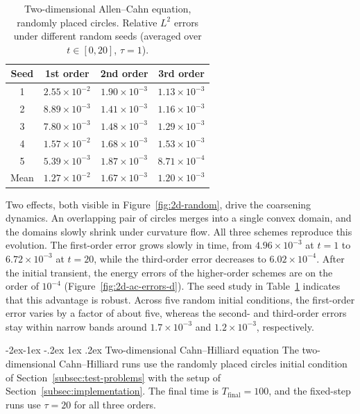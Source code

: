 \documentclass[11pt,letterpaper]{article}
\makeatletter
\theoremstyle{plain}
\theoremstyle{definition}
\renewcommand\subsubsection{\@startsection{subsubsection}{3}{\z@}%
                                     {-2ex\@plus -1ex \@minus -.2ex}%
                                     {1ex \@plus .2ex}%
                                     {\normalfont\normalsize\bfseries}}
\makeatother
\begin{document}
\begin{table}[H]
\centering
\caption{Two-dimensional Allen--Cahn equation, randomly placed circles. Relative $L^2$ errors under different random seeds (averaged over $t \in [0,20]$, $\tau=1$).}
\label{tab:2d-seeds}
\begin{tabular}{c c c c}
\toprule
Seed & 1st order & 2nd order & 3rd order \\
\midrule
1 & $2.55\times10^{-2}$ & $1.90\times10^{-3}$ & $1.13\times10^{-3}$ \\
2 & $8.89\times10^{-3}$ & $1.41\times10^{-3}$ & $1.16\times10^{-3}$ \\
3 & $7.80\times10^{-3}$ & $1.48\times10^{-3}$ & $1.29\times10^{-3}$ \\
4 & $1.57\times10^{-2}$ & $1.68\times10^{-3}$ & $1.53\times10^{-3}$ \\
5 & $5.39\times10^{-3}$ & $1.87\times10^{-3}$ & $8.71\times10^{-4}$ \\
\midrule
Mean & $1.27\times10^{-2}$ & $1.67\times10^{-3}$ & $1.20\times10^{-3}$ \\
\bottomrule
\end{tabular}
\end{table}

Two effects, both visible in Figure~\ref{fig:2d-random}, drive the coarsening dynamics. An overlapping pair of circles merges into a single convex domain, and the domains slowly shrink under curvature flow. All three schemes reproduce this evolution. The first-order error grows slowly in time, from $4.96\times10^{-3}$ at $t=1$ to $6.72\times10^{-3}$ at $t=20$, while the third-order error decreases to $6.02\times10^{-4}$. After the initial transient, the energy errors of the higher-order schemes are on the order of $10^{-4}$ (Figure~\ref{fig:2d-ac-errors-d}). The seed study in Table~\ref{tab:2d-seeds} indicates that this advantage is robust. Across five random initial conditions, the first-order error varies by a factor of about five, whereas the second- and third-order errors stay within narrow bands around $1.7\times10^{-3}$ and $1.2\times10^{-3}$, respectively.


\subsubsection{Two-dimensional Cahn--Hilliard equation} The two-dimensional Cahn--Hilliard runs use the randomly placed circles initial condition of Section~\ref{subsec:test-problems} with the setup of Section~\ref{subsec:implementation}. The final time is $T_{\text{final}}=100$, and the fixed-step runs use $\tau=20$ for all three orders.
\end{document}
